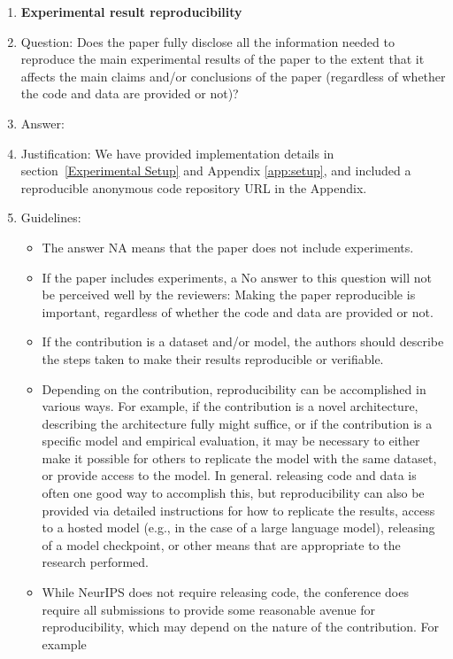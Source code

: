 \documentclass{article}
\begin{document}
\begin{enumerate}
    \item {\bf Experimental result reproducibility}
    \item[] Question: Does the paper fully disclose all the information needed to reproduce the main experimental results of the paper to the extent that it affects the main claims and/or conclusions of the paper (regardless of whether the code and data are provided or not)?
    \item[] Answer: \answerYes{} %
    \item[] Justification: We have provided implementation details in section~\ref{Experimental Setup} and Appendix \ref{app:setup}, and included a reproducible anonymous code repository URL in the Appendix.
    \item[] Guidelines:
    \begin{itemize}
        \item The answer NA means that the paper does not include experiments.
        \item If the paper includes experiments, a No answer to this question will not be perceived well by the reviewers: Making the paper reproducible is important, regardless of whether the code and data are provided or not.
        \item If the contribution is a dataset and/or model, the authors should describe the steps taken to make their results reproducible or verifiable. 
        \item Depending on the contribution, reproducibility can be accomplished in various ways. For example, if the contribution is a novel architecture, describing the architecture fully might suffice, or if the contribution is a specific model and empirical evaluation, it may be necessary to either make it possible for others to replicate the model with the same dataset, or provide access to the model. In general. releasing code and data is often one good way to accomplish this, but reproducibility can also be provided via detailed instructions for how to replicate the results, access to a hosted model (e.g., in the case of a large language model), releasing of a model checkpoint, or other means that are appropriate to the research performed.
        \item While NeurIPS does not require releasing code, the conference does require all submissions to provide some reasonable avenue for reproducibility, which may depend on the nature of the contribution. For example
        \begin{enumerate}

\end{enumerate}
\end{itemize}
\end{enumerate}
\end{document}
